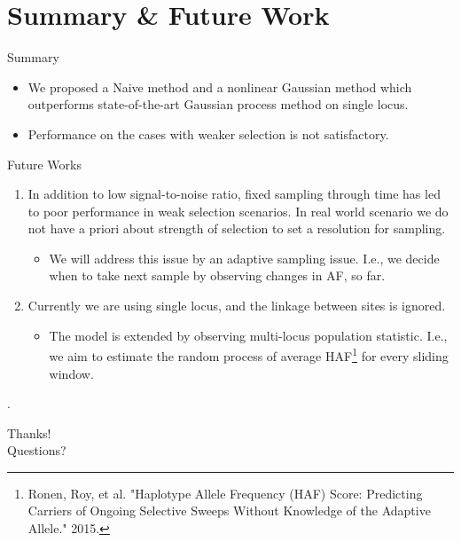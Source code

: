 \documentclass[t]{beamer} %
\begin{document}
\section{Summary \& Future Work}
\begin{frame}{Summary}
\begin{itemize}
\item We proposed  a Naive method and a nonlinear Gaussian method which outperforms state-of-the-art Gaussian process method on single locus.
\item Performance on the cases with weaker selection is not satisfactory.
\end{itemize}
\end{frame}
\begin{frame}{Future Works}
\begin{enumerate}[I]
\item In addition to low signal-to-noise ratio, fixed sampling through time has led to poor performance in weak selection scenarios. In real world scenario we do not have a priori about strength of selection to set a resolution for sampling.
\begin{itemize}
\item We will address this issue by an adaptive sampling issue. I.e., we decide when to take next sample by observing changes in AF, so far.
\end{itemize}
\item Currently we are using single locus, and the linkage between sites is ignored. 
\begin{itemize}
\item The model is extended by observing multi-locus population statistic. I.e., we aim to estimate the random process of average HAF\footnote{Ronen, Roy, et al. "Haplotype Allele Frequency (HAF) Score: Predicting Carriers of Ongoing Selective Sweeps Without Knowledge of the Adaptive Allele." 2015.} for every sliding window.
\end{itemize}

\end{enumerate}


\end{frame}
\begin{frame}{.}
\vspace{1	in}
\begin{center}
	\huge{Thanks!}\\
		\huge{Questions?}\\
\end{center}

\end{frame}
\end{document}
